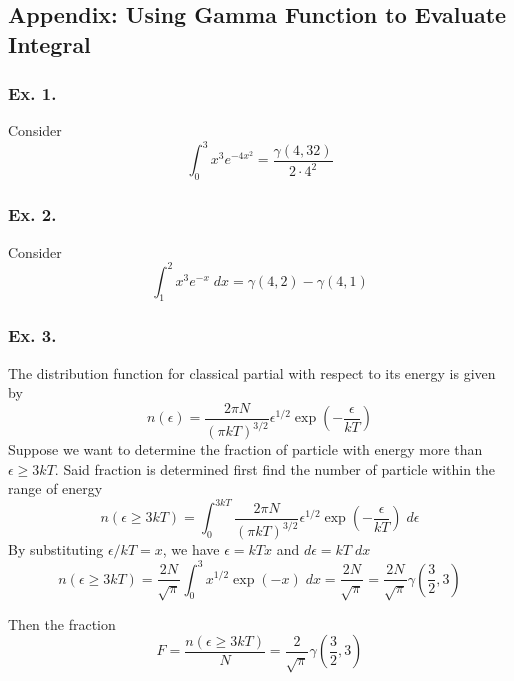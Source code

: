 \documentclass[../../main.tex]{subfiles}
\begin{document}
\subsection*{Appendix: Using Gamma Function to Evaluate Integral}
\subsubsection*{Ex. 1.} Consider
\begin{equation*}
    \int_{0}^{3}x^3e^{-4x^2}=\frac{\gamma(4,32)}{2\cdot4^2}
\end{equation*}

\subsubsection*{Ex. 2.} Consider
\begin{equation*}
    \int_{1}^{2}x^3e^{-x}\;dx=\gamma(4,2)-\gamma(4,1)
\end{equation*}

\subsubsection*{Ex. 3.} The distribution function for classical partial with respect to its energy is given by 
\begin{equation*}
    n(\epsilon)=\frac{2\pi N}{(\pi kT)^{3/2}}\epsilon^{1/2}\exp \left(-\frac{\epsilon}{kT}\right)
\end{equation*}
Suppose we want to determine the fraction of particle with energy more than $\epsilon \geq 3kT$. Said fraction is determined first find the number of particle within the range of energy
\begin{equation*}
    n(\epsilon \geq 3kT)=\int_{0}^{3kT}\frac{2\pi N}{(\pi kT)^{3/2}}\epsilon^{1/2}\exp \left(-\frac{\epsilon}{kT}\right)\;d\epsilon
\end{equation*}
By substituting $\epsilon/kT=x$, we have $\epsilon=kTx$ and $d\epsilon=kT\;dx$
\begin{equation*}
    n(\epsilon \geq 3kT)=\frac{2N}{\sqrt{\pi}}\int_{0}^{3}x^{1/2}\exp \left(-x\right)\;dx=\frac{2N}{\sqrt{\pi}}=\frac{2N}{\sqrt{\pi}}\gamma\left(\frac{3}{2},3\right)
\end{equation*}

Then the fraction
\begin{equation*}
    F=\frac{n(\epsilon \geq 3kT)}{N}=\frac{2}{\sqrt{\pi}}\gamma\left(\frac{3}{2},3\right)
\end{equation*}
\end{document}
